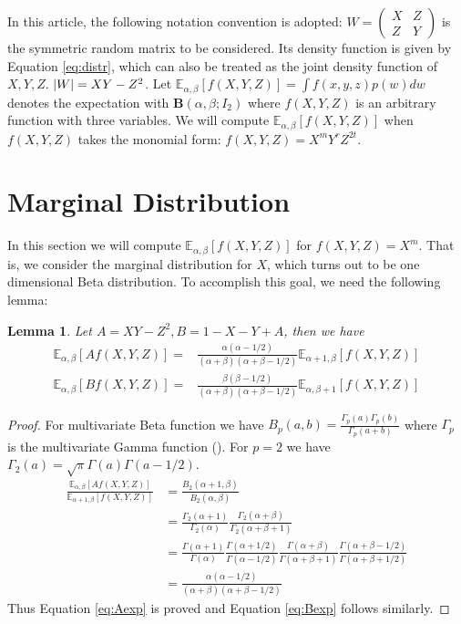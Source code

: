 \documentclass[review,authoryear]{elsarticle}
\DeclarePairedDelimiter\abs{\lvert}{\rvert}
\def\E{\mathbb{E}}
\newtheorem{lemma}{Lemma}
\begin{document}
In this article, the following notation convention is adopted:
$W=\begin{pmatrix} X & Z \\ Z & Y \end{pmatrix}$ is the symmetric random
matrix to be considered. Its density function is given by Equation \eqref{eq:distr}, which can
also be treated as the joint density function of $X,Y,Z$.
$\abs{W}=XY-Z^2$.
Let $\E_{\alpha,\beta}[f(X,Y, Z)] = \int f(x,y,z)p(w)dw$ denotes the expectation
with $\mathbf{B}(\alpha, \beta;I_2)$ where $f(X, Y, Z)$ is an arbitrary function with three
variables. We will compute $\E_{\alpha,\beta}[f(X,Y, Z)]$
when $f(X,Y,Z)$ takes the monomial form: $f(X,Y,Z)=X^m Y^r Z^{2t}$.

\section{Marginal Distribution}
In this section we will compute $\E_{\alpha,\beta}[f(X,Y, Z)]$
for $f(X,Y,Z)=X^m$. That is, we consider the marginal distribution for $X$,
which turns out to be one dimensional Beta distribution.
To accomplish this goal, we need the following lemma:
\begin{lemma}\label{lem:AB}
	Let $A = XY - Z^2, B = 1 - X - Y + A$, then we have
	\begin{align}
	\E_{\alpha, \beta}[Af(X,Y,Z)] =&
	\frac{\alpha(\alpha-1/2)}{(\alpha+\beta)(\alpha+\beta-1/2)}\E_{\alpha+1, \beta}[f(X,Y,Z)]
	\label{eq:Aexp} \\
	\E_{\alpha,\beta}[Bf(X,Y,Z)] =&
	\frac{\beta(\beta-1/2)}{(\alpha+\beta)(\alpha+\beta-1/2)}\E_{\alpha, \beta+1}[f(X,Y,Z)]
	\label{eq:Bexp}
	\end{align}
\end{lemma}
\begin{proof}
	For multivariate Beta function we have
	$B_p(a, b) = \frac{\Gamma_p(a)\Gamma_p(b)}{\Gamma_p(a+b)}$
	where $\Gamma_p$ is the multivariate Gamma function (\cite{ingham_1933}).
	For $p=2$ we have $\Gamma_2(a) = \sqrt{\pi}\Gamma(a)\Gamma(a-1/2)$.
	\begin{align*}
	\frac{\E_{\alpha, \beta}[Af(X,Y,Z)]}{\E_{\alpha+1, \beta}[f(X,Y,Z)]} &
	=\frac{B_2(\alpha+1,\beta)}{B_2(\alpha,\beta)}\\
	&=\frac{\Gamma_2(\alpha+1)}{\Gamma_2(\alpha)}
	\frac{\Gamma_2(\alpha+\beta)}{\Gamma_2(\alpha+\beta+1)}\\
	& =\frac{\Gamma(\alpha+1)}{\Gamma(\alpha)}
	\frac{\Gamma(\alpha+1/2)}{\Gamma(\alpha-1/2)}
	\frac{\Gamma(\alpha+\beta)}{\Gamma(\alpha+\beta+1)}
	\frac{\Gamma(\alpha+\beta-1/2)}{\Gamma(\alpha+\beta+1/2)}\\
	&=\frac{\alpha(\alpha-1/2)}{(\alpha+\beta)(\alpha+\beta-1/2)}
	\end{align*}
	Thus Equation \eqref{eq:Aexp} is proved and Equation \eqref{eq:Bexp} follows similarly.
\end{proof}
\end{document}
